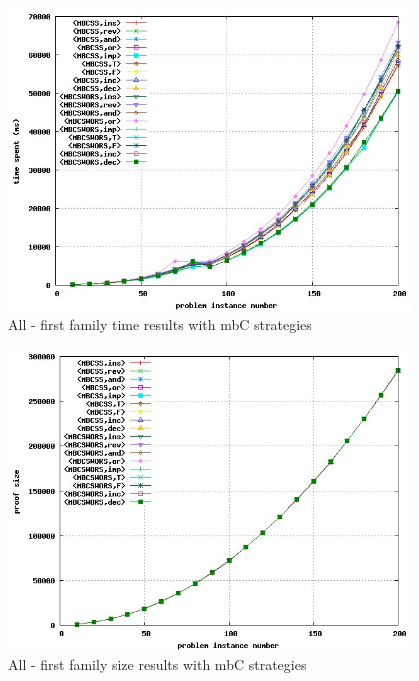 \documentclass[a4paper,10pt]{book}
\newcommand{\mbc}{mbC}
\begin{document}
 

\begin{figure}[!htbp]
\begin{center}
\includegraphics[width=0.95\textwidth]{../mbc_1_a.jpg}
\end{center}
\caption{All - first family time results with \mbc\/ strategies}
\end{figure}


\begin{figure}[!htbp]
\begin{center}
\includegraphics[width=0.95\textwidth]{../mbc_1_b.jpg}
\end{center}
\caption{All - first family size results with \mbc\/ strategies}
\end{figure}
\end{document}
